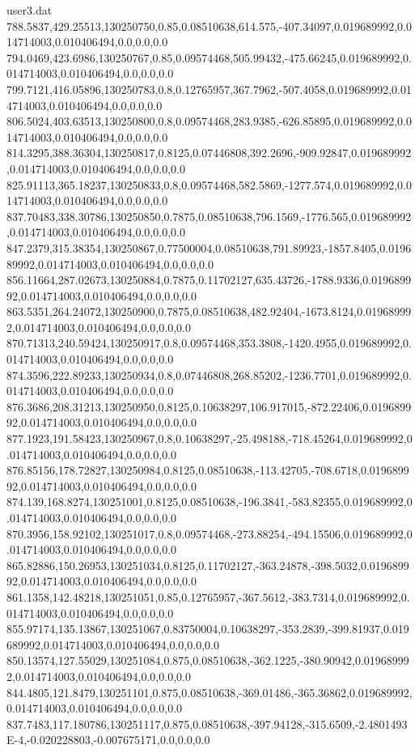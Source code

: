 \begin{filecontents}{user3.dat}
788.5837,429.25513,130250750,0.85,0.08510638,614.575,-407.34097,0.019689992,0.014714003,0.010406494,0.0,0.0,0.0
794.0469,423.6986,130250767,0.85,0.09574468,505.99432,-475.66245,0.019689992,0.014714003,0.010406494,0.0,0.0,0.0
799.7121,416.05896,130250783,0.8,0.12765957,367.7962,-507.4058,0.019689992,0.014714003,0.010406494,0.0,0.0,0.0
806.5024,403.63513,130250800,0.8,0.09574468,283.9385,-626.85895,0.019689992,0.014714003,0.010406494,0.0,0.0,0.0
814.3295,388.36304,130250817,0.8125,0.07446808,392.2696,-909.92847,0.019689992,0.014714003,0.010406494,0.0,0.0,0.0
825.91113,365.18237,130250833,0.8,0.09574468,582.5869,-1277.574,0.019689992,0.014714003,0.010406494,0.0,0.0,0.0
837.70483,338.30786,130250850,0.7875,0.08510638,796.1569,-1776.565,0.019689992,0.014714003,0.010406494,0.0,0.0,0.0
847.2379,315.38354,130250867,0.77500004,0.08510638,791.89923,-1857.8405,0.019689992,0.014714003,0.010406494,0.0,0.0,0.0
856.11664,287.02673,130250884,0.7875,0.11702127,635.43726,-1788.9336,0.019689992,0.014714003,0.010406494,0.0,0.0,0.0
863.5351,264.24072,130250900,0.7875,0.08510638,482.92404,-1673.8124,0.019689992,0.014714003,0.010406494,0.0,0.0,0.0
870.71313,240.59424,130250917,0.8,0.09574468,353.3808,-1420.4955,0.019689992,0.014714003,0.010406494,0.0,0.0,0.0
874.3596,222.89233,130250934,0.8,0.07446808,268.85202,-1236.7701,0.019689992,0.014714003,0.010406494,0.0,0.0,0.0
876.3686,208.31213,130250950,0.8125,0.10638297,106.917015,-872.22406,0.019689992,0.014714003,0.010406494,0.0,0.0,0.0
877.1923,191.58423,130250967,0.8,0.10638297,-25.498188,-718.45264,0.019689992,0.014714003,0.010406494,0.0,0.0,0.0
876.85156,178.72827,130250984,0.8125,0.08510638,-113.42705,-708.6718,0.019689992,0.014714003,0.010406494,0.0,0.0,0.0
874.139,168.8274,130251001,0.8125,0.08510638,-196.3841,-583.82355,0.019689992,0.014714003,0.010406494,0.0,0.0,0.0
870.3956,158.92102,130251017,0.8,0.09574468,-273.88254,-494.15506,0.019689992,0.014714003,0.010406494,0.0,0.0,0.0
865.82886,150.26953,130251034,0.8125,0.11702127,-363.24878,-398.5032,0.019689992,0.014714003,0.010406494,0.0,0.0,0.0
861.1358,142.48218,130251051,0.85,0.12765957,-367.5612,-383.7314,0.019689992,0.014714003,0.010406494,0.0,0.0,0.0
855.97174,135.13867,130251067,0.83750004,0.10638297,-353.2839,-399.81937,0.019689992,0.014714003,0.010406494,0.0,0.0,0.0
850.13574,127.55029,130251084,0.875,0.08510638,-362.1225,-380.90942,0.019689992,0.014714003,0.010406494,0.0,0.0,0.0
844.4805,121.8479,130251101,0.875,0.08510638,-369.01486,-365.36862,0.019689992,0.014714003,0.010406494,0.0,0.0,0.0
837.7483,117.180786,130251117,0.875,0.08510638,-397.94128,-315.6509,-2.4801493E-4,-0.020228803,-0.007675171,0.0,0.0,0.0

\end{filecontents}
